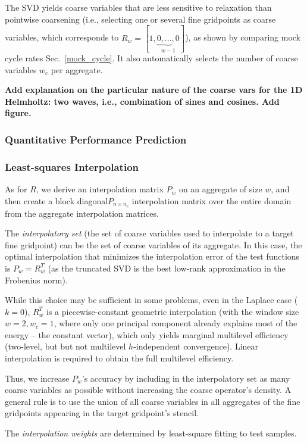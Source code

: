 \documentclass{article}
\begin{document}
The SVD yields coarse variables that are less sensitive to relaxation than pointwise coarsening (i.e., selecting one or several fine gridpoints as coarse variables, which corresponds to $R_w = [1,\underbrace{0,\dots,0}_{w-1}]$), as shown by comparing mock cycle rates Sec.~\ref{mock_cycle}. It also automatically selects the number of coarse variables $w_c$ per aggregate.

{\bf Add explanation on the particular nature of the coarse vars for the 1D Helmholtz: two waves, i.e., combination of sines and cosines. Add figure.}

\subsubsection{Quantitative Performance Prediction}

\subsubsection{Least-squares Interpolation}
As for $R$, we derive an interpolation matrix $P_w$ on an aggregate of size $w$, and then create a block diagonal$P_{n \times n_c}$ interpolation matrix over the entire domain from the aggregate interpolation matrices.

The \emph{interpolatory set} (the set of coarse variables used to interpolate to a target fine gridpoint) can be the set of coarse variables of its aggregate. In this case, the optimal interpolation that minimizes the interpolation error of the test functions is $P_w = R_w^T$ (as the truncated SVD is the best low-rank approximation in the Frobenius norm).

While this choice may be sufficient in some problems, even in the Laplace case ($k=0$), $R_w^T$ is a piecewise-constant geometric interpolation (with the window size $w = 2, w_c = 1$, where only one principal component already explains most of the energy -- the constant vector), which only yields marginal multilevel efficiency (two-level, but but not multilevel $h$-independent convergence). Linear interpolation is required to obtain the full multilevel efficiency.

Thus, we increase $P_w$'s accuracy by including in the interpolatory set as many coarse variables as possible without increasing the coarse operator's density. A general rule is to use the union of all coarse variables in all aggregates of the fine gridpoints appearing in the target gridpoint's stencil.

The \emph{interpolation weights} are determined by least-square fitting to test samples.
\end{document}
